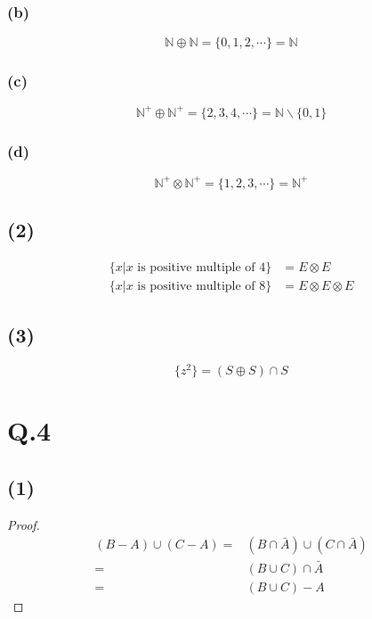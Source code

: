 \documentclass[a4paper,12pt]{article}
\begin{document}
\subsubsection*{(b)}
\begin{equation*}
	\mathbb{N} \oplus \mathbb{N} = \{0, 1, 2, \cdots\} = \mathbb{N}
\end{equation*}

\subsubsection*{(c)}
\begin{equation*}
	\mathbb{N}^+ \oplus \mathbb{N}^+ = \{2, 3, 4, \cdots\} = \mathbb{N} \backslash \{0, 1\}
\end{equation*}

\subsubsection*{(d)}
\begin{equation*}
	\mathbb{N}^+ \otimes \mathbb{N}^+ = \{1, 2, 3, \cdots\} = \mathbb{N}^+
\end{equation*}

\subsection*{(2)}
\begin{align*}
	\{x|x\text{ is positive multiple of 4}\} &= E \otimes E\\
	\{x|x\text{ is positive multiple of 8}\} &= E \otimes E \otimes E
\end{align*}
	
\subsection*{(3)}
\begin{equation*}
	\{z^2\} = (S \oplus S) \cap S
\end{equation*}

\section*{Q.4}

\subsection*{(1)}
\begin{proof}
\begin{align*}
	(B - A) \cup (C - A) =& (B \cap \bar{A}) \cup (C \cap \bar{A})\\ 
	=& (B \cup C) \cap \bar{A}\\
	=& (B \cup C) - A
\end{align*}
\end{proof}
\end{document}
